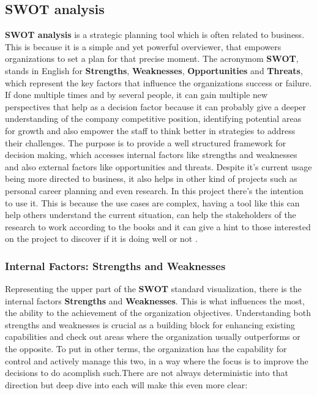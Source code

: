 %
%
%
%
\subsection{SWOT analysis}
\textbf{SWOT analysis} is a strategic planning tool which is often related to business. This is because it is a simple and yet powerful 
overviewer, that empowers organizations to set a plan for that precise moment. The acronymom \textbf{SWOT}, stands in English for 
\textbf{Strengths}, \textbf{Weaknesses}, \textbf{Opportunities} and \textbf{Threats}, which represent the key factors that influence 
the organizations success or failure. If done multiple times and by several people, it can gain multiple new perspectives that help as a 
decision factor because it can probably give a deeper understanding of the company competitive position, identifying potential areas for 
growth and also empower the staff to think better in strategies to address their challenges.
The purpose is to provide a well structured framework for decision making, which accesses internal factors like strengths and weaknesses 
and also external factors like opportunities and threats.
Despite it's current usage being more directed to business, it also helps in other kind of projects such as personal career planning and 
even research. In this project there's the intention to use it. This is because the use cases are complex, having a tool like this can 
help others understand the current situation, can help the stakeholders of the research to work according to the books and it can give a 
hint to those interested on the project to discover if it is doing well or not \cite{swot}.  

\subsubsection{Internal Factors: Strengths and Weaknesses}
Representing the upper part of the \textbf{SWOT} standard visualization, there is the internal factors 
\textbf{Strengths} and \textbf{Weaknesses}. This is what influences the most, the ability to the achievement of the 
organization objectives. Understanding both strengths and weaknesses is crucial as a building block for enhancing existing 
capabilities and check out areas where the organization usually outperforms or the opposite. To put in other terms, the organization 
has the capability for control and actively manage this two, in a way where the focus is to improve the decisions to do acomplish such.There 
are not always deterministic into that direction but deep dive into each will make this even more clear:


